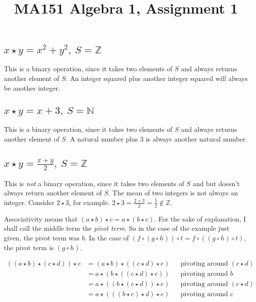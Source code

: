 \documentclass[a4paper]{article}
\title{MA151 Algebra 1, Assignment 1}
\begin{document}
\maketitle

\setlength{\parindent}{0em}
\setlength{\parskip}{1em}


\subsection{$x \star y = x^2 + y^2,\ S = \mathbb Z$}

This is a binary operation, since it takes two elements of $S$ and always returns another element of $S$. An integer squared plus another integer squared will always be another integer.

\subsection{$x \star y = x + 3,\ S = \mathbb N$}

This is a binary operation, since it takes two elements of $S$ and always returns another element of $S$. A natural number plus 3 is always another natural number.

\subsection{$x \star y = \frac{x + y}{2},\ S = \mathbb Z$}

This is \textit{not} a binary operation, since it takes two elements of $S$ and but doesn't always return another element of $S$. The mean of two integers is not always an integer. Consider $2 \star 3$, for example. $2 \star 3 = \frac{2 + 3}{2} = \frac52 \notin \mathbb Z$.


Associativity means that $(a \star b) \star c = a \star (b \star c)$. For the sake of explanation, I shall call the middle term the \textit{pivot term}. So in the case of the example just given, the pivot term was $b$. In the case of $(f \circ (g \circ h)) \circ t = f \circ ((g \circ h) \circ t)$, the pivot term is $(g \circ h)$.

\begin{align*}
	((a \star b) \star (c \star d)) \star e &= (a \star b) \star ((c \star d) \star e) &&\text{pivoting around } (c \star d) \\[1ex]
											&= a \star (b \star ((c \star d) \star e)) &&\text{pivoting around } b \\[1ex]
											&= a \star ((b \star (c \star d)) \star e) &&\text{pivoting around } (c \star d) \\[1ex]
											&= a \star (((b \star c) \star d) \star e) &&\text{pivoting around } c
\end{align*}
\end{document}
